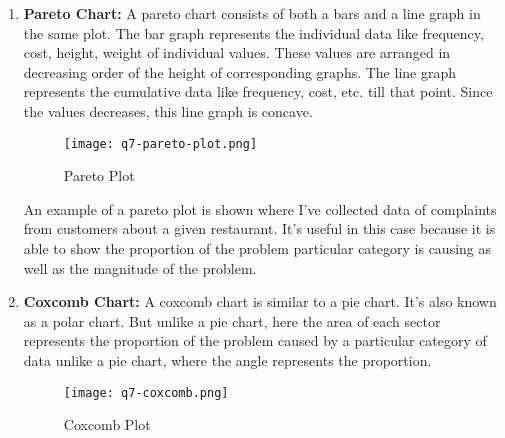 \begin{tcolorbox}[breakable]
\begin{sol}
\begin{enumerate}
			      but also how the data is distributed. Both at
			      once. We can visualise the following data which
			      I've taking from (*) containing the average
			      number of hours a person studies given the number
			      of courses taken
			      \begin{figure}[H]
				      \centering
				      \texttt{[image: q7-violin-plot]}
				      \caption{Violin Plot}
				      \label{fig:violin}
			      \end{figure}
			      As mentioned before, a violin plot can show both
			      statistical summary along with distribution,
			      which a normal plot can't. Here in figure
			      \ref{fig:violin}, the gray line represents the
			      box plot component of it. And the plot you get by
			      rotating it by $90^\circ$ is the distribution
			      plot.
			\item \textbf{Pareto Chart:}
			      A pareto chart consists of both a bars and a line
			      graph in the same plot. The bar graph represents
			      the individual data like frequency, cost, height,
			      weight of individual values. These values are
			      arranged in decreasing order of the height of
			      corresponding graphs. The line graph represents
			      the cumulative data like frequency, cost, etc.
			      till that point. Since the values decreases, this
			      line graph is concave.
			      \begin{figure}[H]
				      \centering
				      \texttt{[image: q7-pareto-plot.png]}
				      \caption{Pareto Plot}
				      \label{fig:pareto}
			      \end{figure}
			      An example of a pareto plot is shown where I've
			      collected data of complaints from customers about
			      a given restaurant. It's useful in this case
			      because it is able to show the proportion of the
			      problem particular category is causing as well as
			      the magnitude of the problem.
			\item \textbf{Coxcomb Chart:}
			      A coxcomb chart is similar to a pie chart. It's
			      also known as a polar chart. But unlike a pie
			      chart, here the area of each sector represents the
			      proportion of the problem caused by a particular
			      category of data unlike a pie chart, where the
			      angle represents the proportion.
			      \begin{figure}[H]
				      \centering
				      \texttt{[image: q7-coxcomb.png]}
				      \caption{Coxcomb Plot}

\end{figure}
\end{enumerate}
\end{sol}
\end{tcolorbox}
